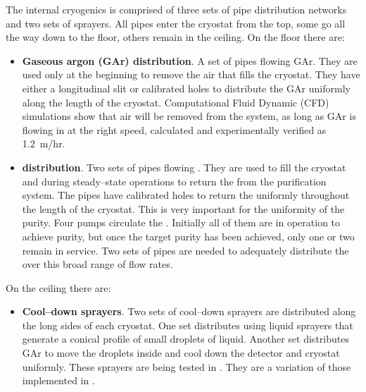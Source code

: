 \label{sec:fdsp-tc-internal-cryo}

The internal cryogenics is comprised of three sets of pipe distribution networks and two sets of sprayers. All pipes enter the cryostat from the top, some go all the way down to the floor, others remain in the ceiling. On the floor there are:
\begin{itemize}
\setlength\itemsep{1mm}
\setlength{\parsep}{1mm}
\setlength{\itemsep}{-5mm}
\item \textbf{Gaseous argon (GAr) distribution}. A set of pipes flowing GAr. They are used only at the beginning to remove the air that fills the cryostat. They have either a longitudinal slit or calibrated holes to distribute the GAr uniformly along the length of the cryostat. Computational Fluid Dynamic (CFD) simulations show that air will be removed from the system, as long as GAr is flowing in at the right speed, calculated and experimentally verified as \SI{1.2}{m/hr}.

\item \textbf{ distribution}. Two sets of pipes flowing . They are used to fill the cryostat and during steady--state operations to return the  from the purification system. The pipes have calibrated holes to return the  uniformly throughout the length of the cryostat. This is very important for the uniformity of the purity. Four pumps circulate the . Initially all of them are in operation to achieve purity, but once the target purity has been achieved, only one or two remain in service. Two sets of pipes are needed to adequately distribute the  over this broad range of flow rates.
\end{itemize}

On the ceiling there are:

\begin{itemize}
\setlength\itemsep{1mm}
\setlength{\parsep}{1mm}
\setlength{\itemsep}{-5mm}
\item \textbf{Cool--down sprayers}. Two sets of cool--down sprayers are distributed along the long sides of each cryostat. One set distributes  using liquid sprayers that generate a conical profile of small droplets of liquid. Another set distributes GAr to move the  droplets inside and cool down the detector and cryostat uniformly. These sprayers are being tested in . They are a variation of those implemented in .
\end{itemize}

